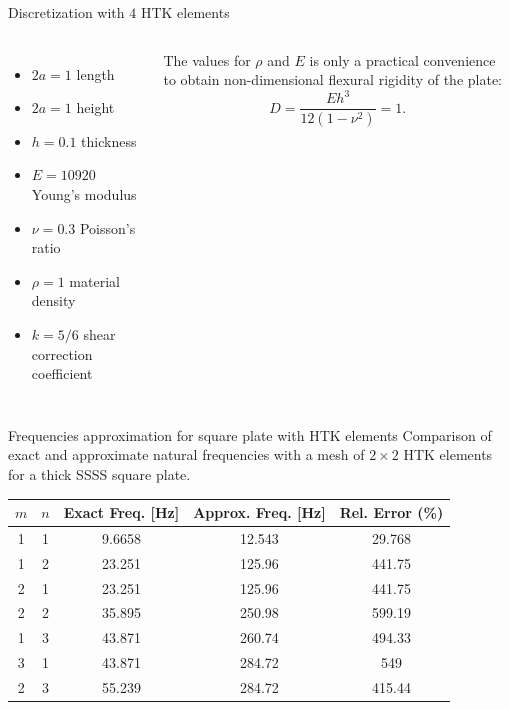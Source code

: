 \documentclass[aspectratio=169]{beamer}
\begin{document}
\begin{frame}{  Discretization with $4$ HTK elements}
\begin{columns}
    {\begin{itemize}\setlength\itemsep{0.05em}
        \item $2a=1$ length
        \item $2a=1$ height
        \item $h=0.1$ thickness
        \item $E=10920$ Young's modulus
        \item $\nu=0.3$ Poisson's ratio
        \item $\rho=1$ material density
        \item $k=5/6$ shear correction coefficient
      \end{itemize}}
    \vspace{0.2cm}
    The values for $\rho$ and $E$ is only a practical convenience to obtain non-dimensional flexural rigidity of the plate:
    $$D = \frac{E h^3}{12(1-\nu^2)}=1.$$
  \end{columns}
\end{frame}


\begin{frame}{Frequencies approximation for square plate with HTK elements}
  \vspace{-1cm}
  Comparison of exact and approximate natural frequencies with a mesh of $2\times 2$ HTK elements for a thick SSSS square plate.
  \vspace{0.3cm}
  \begin{table}[h!]
    \centering
    \begin{tabular}{ccccc}
      \hline
      $m$ & $n$ & Exact Freq. [Hz] & Approx. Freq. [Hz] & Rel. Error (\%) \\
      \hline
      1   & 1   & 9.6658           & 12.543             & 29.768          \\
      1   & 2   & 23.251           & 125.96             & 441.75          \\
      2   & 1   & 23.251           & 125.96             & 441.75          \\
      2   & 2   & 35.895           & 250.98             & 599.19          \\
      1   & 3   & 43.871           & 260.74             & 494.33          \\
      3   & 1   & 43.871           & 284.72             & 549             \\
      2   & 3   & 55.239           & 284.72             & 415.44          \\
      \hline
    \end{tabular}
  \end{table}
\end{frame}
\end{document}
